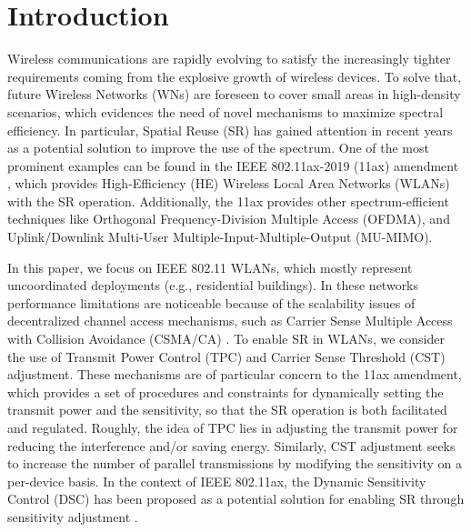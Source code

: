 \documentclass[preprint,12pt]{elsarticle}
\begin{document}
\newpage

\section{Introduction}
\label{section:introduction}
Wireless communications are rapidly evolving to satisfy the increasingly tighter requirements coming from the explosive growth of wireless devices. To solve that, future Wireless Networks (WNs) are foreseen to cover small areas in high-density scenarios, which evidences the need of novel mechanisms to maximize spectral efficiency. In particular, Spatial Reuse (SR) has gained attention in recent years as a potential solution to improve the use of the spectrum. One of the most prominent examples can be found in the IEEE 802.11ax-2019 (11ax) amendment \cite{bellalta2016ax}, which provides High-Efficiency (HE) Wireless Local Area Networks (WLANs) with the SR operation. Additionally, the 11ax provides other spectrum-efficient techniques like Orthogonal Frequency-Division Multiple Access (OFDMA), and Uplink/Downlink Multi-User Multiple-Input-Multiple-Output (MU-MIMO).

In this paper, we focus on IEEE 802.11 WLANs, which mostly represent uncoordinated deployments (e.g., residential buildings). In these networks performance limitations are noticeable because of the scalability issues of decentralized channel access mechanisms, such as Carrier Sense Multiple Access with Collision Avoidance (CSMA/CA) \cite{ergin2007understanding}. To enable SR in WLANs, we consider the use of Transmit Power Control (TPC) and Carrier Sense Threshold (CST) adjustment. These mechanisms are of particular concern to the 11ax amendment, which provides a set of procedures and constraints for dynamically setting the transmit power and the sensitivity, so that the SR operation is both facilitated and regulated. Roughly, the idea of TPC lies in adjusting the transmit power for reducing the interference and/or saving energy. Similarly, CST adjustment seeks to increase the number of parallel transmissions by modifying the sensitivity on a per-device basis. In the context of IEEE 802.11ax, the Dynamic Sensitivity Control (DSC) has been proposed as a potential solution for enabling SR through sensitivity adjustment \cite{smith2015dynamic}.
\end{document}
